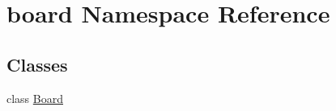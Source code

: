 \hypertarget{namespaceboard}{}\section{board Namespace Reference}
\label{namespaceboard}
\subsection*{Classes}
\begin{DoxyCompactItemize}
\item 
class \mbox{\hyperlink{classboard_1_1_board}{Board}}
\end{DoxyCompactItemize}
